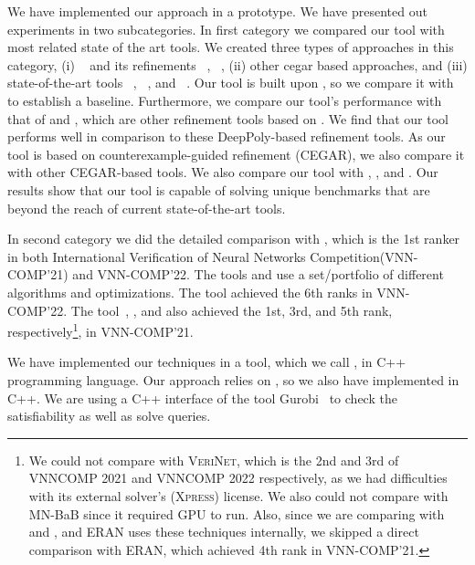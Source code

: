 We have implemented our approach in a prototype. We have presented out experiments in two subcategories. 
In first category we compared our tool with most related state of the art tools. We created three types of approaches in this category, 
(i) \deeppoly{}~\cite{singh2019abstract} and its refinements \kpoly{}~\cite{singh2019beyond}, \deepsrgr{}~\cite{yang2021improving}, 
(ii) other cegar based approaches, and 
(iii) state-of-the-art tools \alphabeta~\cite{zhang2018efficient,wang2021beta,xu2020fast,zhang2022branch,tjeng2017evaluating}, 
\ovaltool~\cite{bunel2018unified,bunel2020branch,bunel2020lagrangian,de2021scaling,de2021scaling,de2021scaling2,de2021improved}, 
and \marabou~\cite{katz2019marabou}. 
Our tool is built upon \deeppoly{}, so we compare it with \deeppoly{} to establish a baseline. 
Furthermore, we compare our tool's performance with that of \kpoly{} and \deepsrgr{}, 
which are other refinement tools based on \deeppoly{}. 
We find that our tool performs well in comparison to these DeepPoly-based refinement tools.
As our tool is based on counterexample-guided refinement (CEGAR), we also compare it with other CEGAR-based tools. 
We also compare our tool with \alphabeta{}, \ovaltool{}, and \marabou{}. 
Our results show that our tool is capable of solving unique benchmarks 
that are beyond the reach of current state-of-the-art tools.

In second category we did the detailed comparison with \alphabeta{}, which is the 1st ranker in both 
International Verification of Neural Networks Competition(VNN-COMP'21) and VNN-COMP'22. 
The tools \alphabeta{} and \ovaltool{} use a set/portfolio of different algorithms and optimizations.
The tool \marabou{} achieved the 6th ranks in VNN-COMP'22.  
The tool~\alphabeta{}, \ovaltool{}, and \marabou{} also achieved the 1st, 3rd, and 5th rank, 
respectively\footnote{We could not compare with \textsc{VeriNet}, which is the 2nd and 3rd of VNNCOMP 2021 and VNNCOMP 2022 respectively, as we had difficulties with its external solver's (\textsc{Xpress}) license. We also
could not compare with MN-BaB since it required GPU to run.  
Also, since we are comparing with \deeppoly{} and \kpoly{}, and \textsc{ERAN} uses these techniques internally, we skipped a direct comparison with \textsc{ERAN}, which achieved 4th rank in VNN-COMP'21.}, 
in VNN-COMP'21.


\medskip

We have implemented our techniques in a tool, which we call \drefine{}, in \textsc{C++} programming language. Our approach relies on \deeppoly{}, so we also have implemented \deeppoly{} in \textsc{C++}. We are using a \textsc{C++} interface of the tool Gurobi~\cite{gurobioptimizer} to check the satisfiability as well as solve  \maxsat{} queries. %

